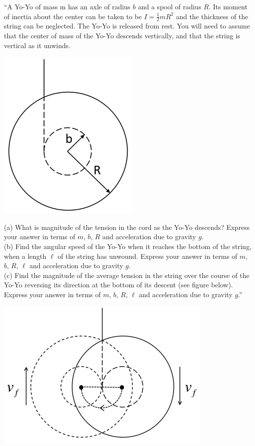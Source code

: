 \documentclass[8.01x]{subfiles}
\begin{document}
``A Yo-Yo of mass m has an axle of radius $b$ and a spool of radius $R$. Its moment of inertia about the center can be taken to be $\displaystyle I = \frac{1}{2}m R^2$ and the thickness of the string can be neglected. The Yo-Yo is released from rest. You will need to assume that the center of mass of the Yo-Yo descends vertically, and that the string is vertical as it unwinds.

\begin{center}
\includegraphics[scale=0.45]{Graphics/h8p3}
\end{center}

(a) What is magnitude of the tension in the cord as the Yo-Yo descends? Express your answer in terms of $m$, $b$, $R$ and acceleration due to gravity $g$.\\
(b) Find the angular speed of the Yo-Yo when it reaches the bottom of the string, when a length $\ell$ of the string has unwound. Express your answer in terms of $m$, $b$, $R$, $\ell$ and acceleration due to gravity $g$.\\
(c) Find the magnitude of the average tension in the string over the course of the Yo-Yo reversing its direction at the bottom of its descent (see figure below). Express your answer in terms of $m$, $b$, $R$, $\ell$ and acceleration due to gravity $g$.''

\begin{center}
\includegraphics[scale=0.5]{Graphics/h8p3_2}
\end{center}
\end{document}
